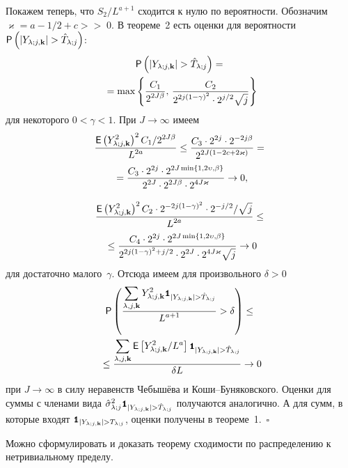 \begin{multicols}{2}
Покажем теперь, что $S_2/L^{a+1}$ сходится к нулю по вероятности. 
Обозначим $\varkappa = a-1/2+c>$\linebreak $>\;0$. В теореме~2 есть оценки для вероятности 
${\sf P}\left( |Y_{\lambda;j,\mathbf{k}}| > \hat T_{\lambda;j} \right)$:
\begin{multline}
{\sf P}\left( |Y_{\lambda;j,\mathbf{k}}| > \hat T_{\lambda;j} \right) = {}\\
{}=\max\left\{ \displaystyle\frac{\displaystyle C_1\mathstrut}{\displaystyle 2^{2J\beta}\mathstrut},\,\displaystyle\frac{\displaystyle C_2\mathstrut}{\displaystyle 2^{2j(1-\gamma)^2}\cdot 2^{j/2}\sqrt{j}\mathstrut} \right\} 
\label{eq_ProbYghTOrdersTomo}
\end{multline}
для некоторого $0<\gamma<1$. При $J\rightarrow\infty$ имеем
\begin{multline}
\label{eq_restEstimConsistTomo1}
\displaystyle\frac{\displaystyle {\sf E} \left(Y_{\lambda;j,\mathbf{k}}^2\right)^2 C_1/2^{2J\beta}\mathstrut}{\displaystyle L^{2a}\mathstrut} \leq \displaystyle\frac{\displaystyle C_3\cdot 2^{2j}
\cdot 2^{-2j\beta}\mathstrut}{\displaystyle 2^{2J(1-2c+2\varkappa)}\mathstrut} ={}\\
{}= \displaystyle\frac{\displaystyle C_3\cdot 2^{2j}\cdot2^{2J\min\left\{1, 2\upsilon, \beta\right\}}\mathstrut}{\displaystyle 2^{2J}\cdot 2^{2J\beta}\cdot 2^{4J\varkappa}\mathstrut}  \rightarrow 0,
\end{multline}

\columnbreak 

\noindent
\begin{multline}
\displaystyle\frac{\displaystyle {\sf E} \left(Y_{\lambda;j,\mathbf{k}}^2\right)^2 C_2\cdot 2^{-2j(1-\gamma)^2}\cdot 2^{-j/2}/\sqrt{j}\mathstrut}{\displaystyle L^{2a}\mathstrut} \leq {}\\
{}\leq
\displaystyle\frac{\displaystyle C_4\cdot 2^{2j}\cdot 2^{2J\min\left\{1, 2\upsilon, \beta\right\}}\mathstrut}{\displaystyle 2^{2j(1-\gamma)^2+j/2}\cdot 2^{2J}\cdot 2^{4J\varkappa}\sqrt{j}\mathstrut} \rightarrow 0
\label{eq_restEstimConsistTomo2}
\end{multline}
для достаточно малого~$\gamma$. Отсюда имеем для произвольного $\delta>0$
\begin{multline*}
\p\left(\fr{\sumljk \Yljk^2 \indYjkghTj }{L^{a+1}}>\delta\right) \leq{}\\
{}\leq
\fr{\sumljk \e \left[\Yljk^2/L^a\right] \indYjkghTj  }{\delta L} \rightarrow 0
\end{multline*}
при $J\rightarrow\infty$ в силу неравенств Чебышёва и Коши--Бу\-ня\-ков\-ско\-го. Оценки для суммы 
с членами вида $\hslj \indYjkghTj$ получаются аналогично. А для сумм, в которые входят $\indYjkgTj$, 
оценки получены в теореме~1.~$\square$

Можно сформулировать и доказать теорему сходимости по распределению к нетривиальному пределу.

\medskip


\end{multicols}
